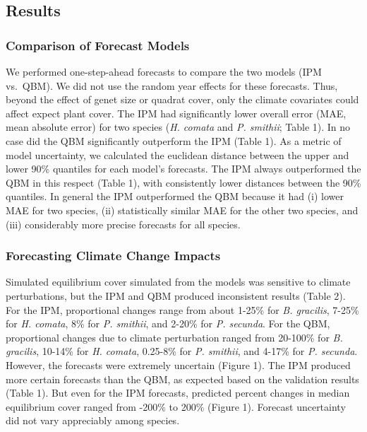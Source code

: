 \documentclass[12pt,]{article}
\begin{document}
\subsection{Results}\label{results}

\subsubsection{Comparison of Forecast
Models}\label{comparison-of-forecast-models}

We performed one-step-ahead forecasts to compare the two models (IPM
vs.~QBM). We did not use the random year effects for these forecasts.
Thus, beyond the effect of genet size or quadrat cover, only the climate
covariates could affect expect plant cover. The IPM had significantly
lower overall error (MAE, mean absolute error) for two species (\emph{H.
comata} and \emph{P. smithii}; Table 1). In no case did the QBM
significantly outperform the IPM (Table 1). As a metric of model
uncertainty, we calculated the euclidean distance between the upper and
lower 90\% quantiles for each model's forecasts. The IPM always
outperformed the QBM in this respect (Table 1), with consistently lower
distances between the 90\% quantiles. In general the IPM outperformed
the QBM because it had (i) lower MAE for two species, (ii) statistically
similar MAE for the other two species, and (iii) considerably more
precise forecasts for all species.

\subsubsection{Forecasting Climate Change
Impacts}\label{forecasting-climate-change-impacts}

Simulated equilibrium cover simulated from the models was sensitive to
climate perturbations, but the IPM and QBM produced inconsistent results
(Table 2). For the IPM, proportional changes range from about 1-25\% for
\emph{B. gracilis}, 7-25\% for \emph{H. comata}, 8\% for \emph{P.
smithii}, and 2-20\% for \emph{P. secunda}. For the QBM, proportional
changes due to climate perturbation ranged from 20-100\% for \emph{B.
gracilis}, 10-14\% for \emph{H. comata}, 0.25-8\% for \emph{P. smithii},
and 4-17\% for \emph{P. secunda}. However, the forecasts were extremely
uncertain (Figure 1). The IPM produced more certain forecasts than the
QBM, as expected based on the validation results (Table 1). But even for
the IPM forecasts, predicted percent changes in median equilibrium cover
ranged from -200\% to 200\% (Figure 1). Forecast uncertainty did not
vary appreciably among species.
\end{document}
